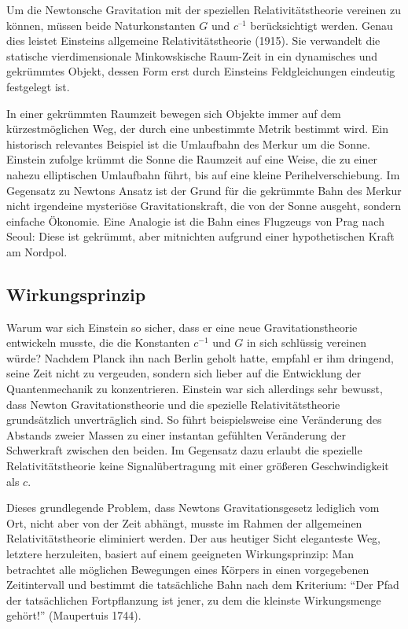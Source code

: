 \documentclass{scrartcl}
\begin{document}
\newpage {}
\label{sec:1100}

Um die Newtonsche Gravitation mit der speziellen Relativitätstheorie vereinen zu können, müssen beide Naturkonstanten $G$ und $c^{–1}$ berücksichtigt werden. Genau dies leistet Einsteins allgemeine Relativitätstheorie (1915). Sie verwandelt die statische vierdimensionale Minkowskische Raum-Zeit in ein dynamisches und gekrümmtes Objekt, dessen Form erst durch Einsteins Feldgleichungen eindeutig festgelegt ist.

In einer gekrümmten Raumzeit bewegen sich Objekte immer auf dem kürzestmöglichen Weg, der durch eine unbestimmte Metrik bestimmt wird. Ein historisch relevantes Beispiel ist die Umlaufbahn des Merkur um die Sonne. Einstein zufolge krümmt die Sonne die Raumzeit auf eine Weise, die zu einer nahezu elliptischen Umlaufbahn führt, bis auf eine kleine Perihelverschiebung. Im Gegensatz zu Newtons Ansatz ist der Grund für die gekrümmte Bahn des Merkur nicht irgendeine mysteriöse Gravitationskraft, die von der Sonne ausgeht, sondern einfache Ökonomie. Eine Analogie ist die Bahn eines Flugzeugs von Prag nach Seoul: Diese ist gekrümmt, aber mitnichten aufgrund einer hypothetischen Kraft am Nordpol.


\subsection*{Wirkungsprinzip}

Warum war sich Einstein so sicher, dass er eine neue Gravitationstheorie entwickeln musste, die die Konstanten $c^{−1}$ und $G$ in sich schlüssig vereinen würde? Nachdem Planck ihn nach Berlin geholt hatte, empfahl er ihm dringend, seine Zeit nicht zu vergeuden, sondern sich lieber auf die Entwicklung der Quantenmechanik zu konzentrieren. Einstein war sich allerdings sehr bewusst, dass Newton Gravitationstheorie und die spezielle Relativitätstheorie grundsätzlich unverträglich sind. So führt beispielsweise eine Veränderung des Abstands zweier Massen zu einer instantan gefühlten Veränderung der Schwerkraft zwischen den beiden. Im Gegensatz dazu erlaubt die spezielle Relativitätstheorie keine Signalübertragung mit einer größeren Geschwindigkeit als $c$.

Dieses grundlegende Problem, dass Newtons Gravitationsgesetz lediglich vom Ort, nicht aber von der Zeit abhängt, musste im Rahmen der allgemeinen Relativitätstheorie eliminiert werden. Der aus heutiger Sicht eleganteste Weg, letztere herzuleiten, basiert auf einem geeigneten Wirkungsprinzip: Man betrachtet alle möglichen Bewegungen eines Körpers in einen vorgegebenen Zeitintervall und bestimmt die tatsächliche Bahn nach dem Kriterium: \enquote{Der Pfad der tatsächlichen Fortpflanzung ist jener, zu dem die kleinste Wirkungsmenge gehört!} (Maupertuis 1744).
\end{document}
